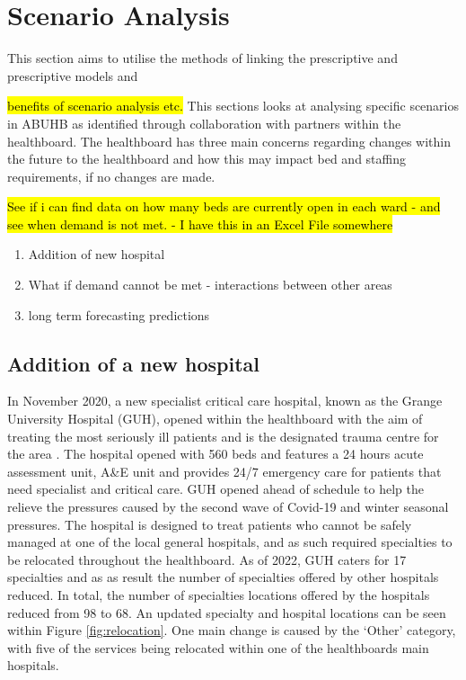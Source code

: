 \documentclass[../thesis.tex]{subfiles}
\begin{document}
\newpage



\section{Scenario Analysis}
This section aims to utilise the methods of linking the prescriptive and prescriptive models and 

\hl{benefits of scenario analysis etc.}
This sections looks at analysing specific scenarios in ABUHB as identified through collaboration with partners within the healthboard. The healthboard has three main concerns regarding changes within the future to the healthboard and how this may impact bed and staffing requirements, if no changes are made.

\hl{See if i can find data on how many beds are currently open in each ward - and see when demand is not met. - I have this in an Excel File somewhere}

\begin{enumerate}
    \item Addition of new hospital
    \item What if demand cannot be met - interactions between other areas 
    \item long term forecasting predictions
\end{enumerate}


\subsection{Addition of a new hospital}\label{sec:scenario1}
In November 2020, a new specialist critical care hospital, known as the Grange University Hospital (GUH), opened within the healthboard with the aim of treating the most seriously ill patients and is the designated trauma centre for the area \cite{NHSWalesa}. The hospital opened with 560 beds and features a 24 hours acute assessment unit, A\&E unit and provides 24/7 emergency care for patients that need specialist and critical care. GUH opened ahead of schedule to help the relieve the pressures caused by the second wave of Covid-19 and winter seasonal pressures. The hospital is designed to treat patients who cannot be safely managed at one of the local general hospitals, and as such required specialties to be relocated throughout the healthboard. As of 2022, GUH caters for 17 specialties and as as result the number of specialties offered by other hospitals reduced. In total, the number of specialties locations offered by the hospitals reduced from 98 to 68. An updated specialty and hospital locations can be seen within Figure \ref{fig:relocation}. One main change is caused by the `Other' category, with five of the services being relocated within one of the healthboards main hospitals.
\end{document}
